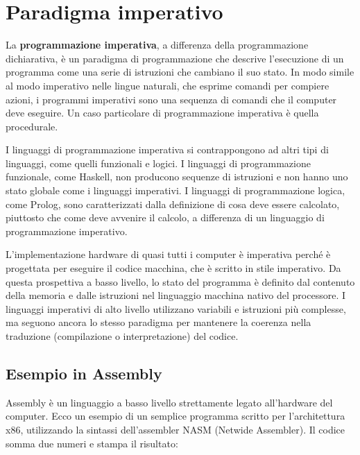 \documentclass[
  letterpaper,
  DIV=11,
  numbers=noendperiod]{scrreprt}
\begin{document}
\section{Paradigma imperativo}\label{paradigma-imperativo}

La \textbf{programmazione imperativa}, a differenza della programmazione
dichiarativa, è un paradigma di programmazione che descrive l'esecuzione
di un programma come una serie di istruzioni che cambiano il suo stato.
In modo simile al modo imperativo nelle lingue naturali, che esprime
comandi per compiere azioni, i programmi imperativi sono una sequenza di
comandi che il computer deve eseguire. Un caso particolare di
programmazione imperativa è quella procedurale.

I linguaggi di programmazione imperativa si contrappongono ad altri tipi
di linguaggi, come quelli funzionali e logici. I linguaggi di
programmazione funzionale, come Haskell, non producono sequenze di
istruzioni e non hanno uno stato globale come i linguaggi imperativi. I
linguaggi di programmazione logica, come Prolog, sono caratterizzati
dalla definizione di cosa deve essere calcolato, piuttosto che come deve
avvenire il calcolo, a differenza di un linguaggio di programmazione
imperativo.

L'implementazione hardware di quasi tutti i computer è imperativa perché
è progettata per eseguire il codice macchina, che è scritto in stile
imperativo. Da questa prospettiva a basso livello, lo stato del
programma è definito dal contenuto della memoria e dalle istruzioni nel
linguaggio macchina nativo del processore. I linguaggi imperativi di
alto livello utilizzano variabili e istruzioni più complesse, ma seguono
ancora lo stesso paradigma per mantenere la coerenza nella traduzione
(compilazione o interpretazione) del codice.

\subsection{Esempio in Assembly}\label{esempio-in-assembly}

Assembly è un linguaggio a basso livello strettamente legato
all'hardware del computer. Ecco un esempio di un semplice programma
scritto per l'architettura x86, utilizzando la sintassi dell'assembler
NASM (Netwide Assembler). Il codice somma due numeri e stampa il
risultato:
\end{document}

